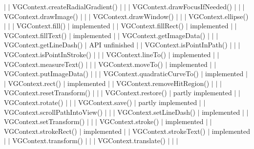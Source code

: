 $\vert$ $\vert$ {\ttfamily V\+G\+Context.\+create\+Radial\+Gradient()} $\vert$ $\vert$ $\vert$ {\ttfamily V\+G\+Context.\+draw\+Focus\+If\+Needed()} $\vert$ $\vert$ $\vert$ {\ttfamily V\+G\+Context.\+draw\+Image()} $\vert$ $\vert$ $\vert$ {\ttfamily V\+G\+Context.\+draw\+Window()} $\vert$ $\vert$ $\vert$ {\ttfamily V\+G\+Context.\+ellipse()} $\vert$ $\vert$ $\vert$ {\ttfamily V\+G\+Context.\+fill()} $\vert$ implemented $\vert$ $\vert$ {\ttfamily V\+G\+Context.\+fill\+Rect()} $\vert$ implemented $\vert$ $\vert$ {\ttfamily V\+G\+Context.\+fill\+Text()} $\vert$ implemented $\vert$ $\vert$ {\ttfamily V\+G\+Context.\+get\+Image\+Data()} $\vert$ $\vert$ $\vert$ {\ttfamily V\+G\+Context.\+get\+Line\+Dash()} $\vert$ A\+P\+I unfinished $\vert$ $\vert$ {\ttfamily V\+G\+Context.\+is\+Point\+In\+Path()} $\vert$ $\vert$ $\vert$ {\ttfamily V\+G\+Context.\+is\+Point\+In\+Stroke()} $\vert$ $\vert$ $\vert$ {\ttfamily V\+G\+Context.\+line\+To()} $\vert$ implemented $\vert$ $\vert$ {\ttfamily V\+G\+Context.\+measure\+Text()} $\vert$ $\vert$ $\vert$ {\ttfamily V\+G\+Context.\+move\+To()} $\vert$ implemented $\vert$ $\vert$ {\ttfamily V\+G\+Context.\+put\+Image\+Data()} $\vert$ $\vert$ $\vert$ {\ttfamily V\+G\+Context.\+quadratic\+Curve\+To()} $\vert$ implemented $\vert$ $\vert$ {\ttfamily V\+G\+Context.\+rect()} $\vert$ implemented $\vert$ $\vert$ {\ttfamily V\+G\+Context.\+remove\+Hit\+Region()} $\vert$ $\vert$ $\vert$ {\ttfamily V\+G\+Context.\+reset\+Transform()} $\vert$ $\vert$ $\vert$ {\ttfamily V\+G\+Context.\+restore()} $\vert$ partly implemented $\vert$ $\vert$ {\ttfamily V\+G\+Context.\+rotate()} $\vert$ $\vert$ $\vert$ {\ttfamily V\+G\+Context.\+save()} $\vert$ partly implemented $\vert$ $\vert$ {\ttfamily V\+G\+Context.\+scroll\+Path\+Into\+View()} $\vert$ $\vert$ $\vert$ {\ttfamily V\+G\+Context.\+set\+Line\+Dash()} $\vert$ implemented $\vert$ $\vert$ {\ttfamily V\+G\+Context.\+set\+Transform()} $\vert$ $\vert$ $\vert$ {\ttfamily V\+G\+Context.\+stroke()} $\vert$ implemented $\vert$ $\vert$ {\ttfamily V\+G\+Context.\+stroke\+Rect()} $\vert$ implemented $\vert$ $\vert$ {\ttfamily V\+G\+Context.\+stroke\+Text()} $\vert$ implemented $\vert$ $\vert$ {\ttfamily V\+G\+Context.\+transform()} $\vert$ $\vert$ $\vert$ {\ttfamily V\+G\+Context.\+translate()} $\vert$ $\vert$ $\vert$ 